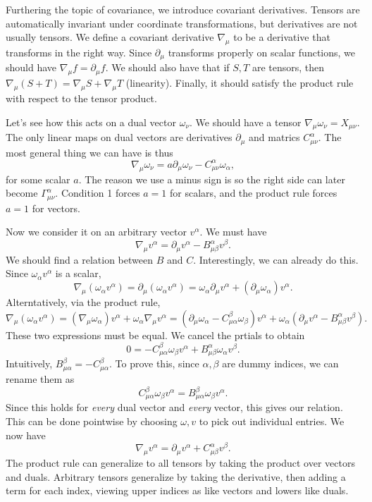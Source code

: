 
Furthering the topic of covariance, we introduce covariant derivatives. Tensors are automatically invariant under coordinate transformations, but derivatives are not usually tensors. We define a covariant derivative $\nabla _\mu $ to be a derivative that transforms in the right way. Since $\partial _\mu $ transforms properly on scalar functions, we should have $\nabla_\mu f=\partial _\mu f$. We should also have that if $S,T$ are tensors, then $\nabla _\mu (S+T)=\nabla _\mu S+\nabla _\mu T$ (linearity). Finally, it should satisfy the product rule with respect to the tensor product.

Let's see how this acts on a dual vector $\omega _\nu $. We should have a tensor $\nabla _\mu \omega _\nu =X_{\mu \nu } $. The only linear maps on dual vectors are derivatives $\partial _\mu $ and matrics $C_{\mu \nu } ^\alpha $. The most general thing we can have is thus
\[
	\nabla _\mu \omega _\nu =a \partial _\mu \omega _\nu -C_{\mu \nu } ^\alpha \omega _\alpha ,
\]
for some scalar $a$. The reason we use a minus sign is so the right side can later become $\Gamma _{\mu \nu } ^\alpha $. Condition 1 forces $a=1$ for scalars, and the product rule forces $a=1$ for vectors.

Now we consider it on an arbitrary vector $v^\alpha $. We must have
\[
	\nabla _\mu v^\alpha =\partial _\mu v^\alpha -B_{\mu \beta }^{\alpha } v^\beta 
.\]
We should find a relation between $B$ and $C$. Interestingly, we can already do this. Since $\omega _\alpha v^\alpha $ is a scalar,
\[
	\nabla _\mu (\omega _\alpha v^\alpha )=\partial _\mu (\omega _\alpha v^\alpha )=\omega _\alpha \partial _\mu v^\alpha +\left( \partial _\mu \omega _\alpha  \right) v^\alpha 
.\]
Alterntatively, via the product rule,
\[
	\nabla _\mu (\omega _\alpha v^\alpha )=(\nabla _\mu \omega _\alpha )v^\alpha +\omega _\alpha \nabla _\mu v^\alpha =\left( \partial _\mu \omega _\alpha -C_{\mu \alpha } ^\beta \omega _\beta \right) v^\alpha +\omega _\alpha \left( \partial _\mu v^\alpha -B_{\mu \beta } ^\alpha v^\beta  \right) 
.\]
These two expressions must be equal. We cancel the prtials to obtain
\[
	0=-C_{\mu \alpha } ^\beta \omega _\beta  v^\alpha +  B_{\mu \beta } ^\alpha \omega _\alpha v^\beta 
.\]
Intuitively, $B_{\mu \alpha } ^\beta =-C_{\mu \alpha } ^\beta $. To prove this, since $\alpha ,\beta $ are dummy indices, we can rename them as
\[
	C_{\mu \alpha } ^\beta \omega _\beta v^\alpha =B_{\mu \alpha } ^\beta  \omega _\beta v^\alpha 
.\]
Since this holds for \emph{every} dual vector and \emph{every} vector, this gives our relation. This can be done pointwise by choosing $\omega ,v$ to pick out individual entries. We now have
\[
	\nabla _\mu v^\alpha =\partial _\mu v^\alpha +C_{\mu \beta } ^\alpha  v^\beta 
.\]
The product rule can generalize to all tensors by taking the product over vectors and duals. Arbitrary tensors generalize by taking the derivative, then adding a term for each index, viewing upper indices as like vectors and lowers like duals.


